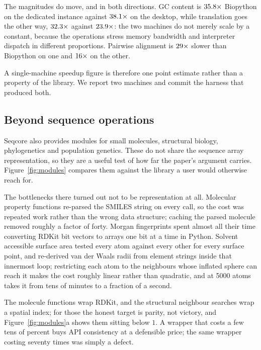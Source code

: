 \documentclass[10pt,letterpaper]{article}
\begin{document}
The magnitudes do move, and in both directions. GC content is
$35.8\times$ Biopython on the dedicated instance against
$38.1\times$ on the desktop, while translation goes the other way,
$32.3\times$ against $23.9\times$: the two machines do not
merely scale by a constant, because the operations stress memory bandwidth and
interpreter dispatch in different proportions. Pairwise alignment is
$29\times$ slower than Biopython on one and $16\times$
on the other.

A single-machine speedup figure is therefore one point estimate rather than a
property of the library. We report two machines and commit the harness that
produced both.
\fi

\subsection{Beyond sequence operations}
\label{sec:res:modules}

Seqcore also provides modules for small molecules, structural biology,
phylogenetics and population genetics. These do not share the sequence array
representation, so they are a useful test of how far the paper's argument
carries. Figure~\ref{fig:modules} compares them against the library a user would
otherwise reach for.

The bottlenecks there turned out not to be representation at all. Molecular
property functions re-parsed the SMILES string on every call, so the cost was
repeated work rather than the wrong data structure; caching the parsed molecule
removed roughly a factor of forty. Morgan fingerprints spent almost all their
time converting RDKit bit vectors to arrays one bit at a time in Python. Solvent
accessible surface area tested every atom against every other for every surface
point, and re-derived van der Waals radii from element strings inside that
innermost loop; restricting each atom to the neighbours whose inflated sphere
can reach it makes the cost roughly linear rather than quadratic, and at 5000
atoms takes it from tens of minutes to a fraction of a second.

The molecule functions wrap
RDKit, and the structural neighbour searches wrap a spatial index; for those the
honest target is parity, not victory, and Figure~\ref{fig:modules}a shows them
sitting below $1$. A wrapper that costs a few tens of percent buys API
consistency at a defensible price; the same wrapper costing seventy times was
simply a defect.
\end{document}
